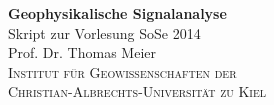 \begin{titlepage}
\begin{center}
\vspace*{2cm}
\Huge
\textbf{Geophysikalische Signalanalyse} \\[2cm]
\LARGE
Skript zur Vorlesung SoSe 2014\\[8cm]
\Large
Prof. Dr. Thomas Meier \\[3cm]
\textsc{Institut für Geowissenschaften der\\Christian-Albrechts-Universität zu Kiel}
\end{center}
\end{titlepage} 